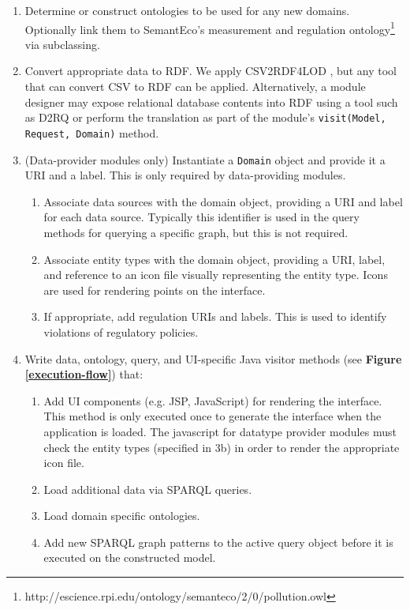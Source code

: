 \documentclass[letterpaper]{report}
\begin{document}
\begin{enumerate}
\item Determine or construct ontologies to be used for any new domains. Optionally link them to SemantEco's measurement and regulation ontology\footnote{http://escience.rpi.edu/ontology/semanteco/2/0/pollution.owl} via subclassing.
\item Convert appropriate data to RDF. We apply CSV2RDF4LOD \cite{lebo2011producing}, but any tool that can convert CSV to RDF can be applied. Alternatively, a module designer may expose relational database contents into RDF using a tool such as D2RQ or perform the translation as part of the module's \texttt{visit(Model, Request, Domain)} method.
\item (Data-provider modules only) Instantiate a \texttt{Domain} object and provide it a URI and a label. This is only required by data-providing modules.
\begin{enumerate}%
\item Associate data sources with the domain object, providing a URI and label for each data source.
Typically this identifier is used in the query methods for querying a specific graph, but this is not required.
\item Associate entity types with the domain object, providing a URI, label, and reference to an icon file visually representing the entity type.
Icons are used for rendering points on the interface.
\item If appropriate, add regulation URIs and labels.
This is used to identify violations of regulatory policies.
\end{enumerate}
\item Write data, ontology, query, and UI-specific Java visitor methods (see \textbf{Figure \ref{execution-flow}}) that:
\begin{enumerate}%
\item Add UI components (e.g. JSP, JavaScript) for rendering the interface. This method is only executed once to generate the interface when the application is loaded.
The javascript for datatype provider modules must check the entity types (specified in 3b) in order to render the appropriate icon file.
\item Load additional data via SPARQL queries.
\item Load domain specific ontologies.
\item Add new SPARQL graph patterns to the active query object before it is executed on the constructed model.

\end{enumerate}
\end{enumerate}
\end{document}
